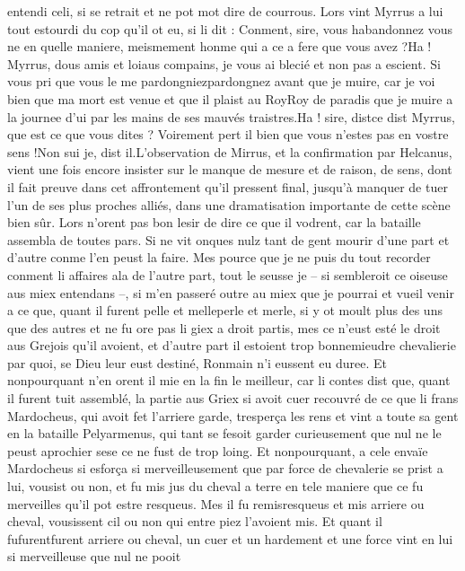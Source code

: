 \documentclass{article}
\begin{document}
\begin{pages}
   entendi celi, si se retrait et ne pot mot dire de courrous. Lors vint Myrrus a lui tout estourdi 
   du cop qu’il ot eu, si li dit :
   Conment, sire, vous habandonnez vous 
      ne en quelle maniere, meismement honme qui a ce a fere que vous avez ?Ha ! Myrrus, dous amis et loiaus compains, je vous ai blecié et non 
      pas a escient. Si vous pri que vous le me pardongniezpardongnez avant 
      que je muire, car je voi bien que ma mort est 
   venue et que il plaist au RoyRoy de paradis que je muire a la journee 
      d’ui par les mains de ses mauvés traistres.Ha ! sire, distce dist 
      Myrrus, que est ce que vous dites ? Voirement pert il bien que vous n’estes pas en vostre sens !Non sui je, dist il.L'observation de Mirrus, et la confirmation 
   par Helcanus, vient une fois encore insister sur le manque de mesure et de raison, de sens, dont il fait preuve dans cet affrontement 
   qu'il pressent final, jusqu'à manquer de tuer l'un de ses plus proches alliés, dans une dramatisation importante de cette scène bien sûr. 
   Lors n’orent pas bon lesir de dire ce que il vodrent, 
   car la bataille assembla de toutes pars. Si ne vit onques nulz tant de gent mourir d’une part et d’autre conme l’en peust la faire. 
   Mes pource que je ne puis du tout recorder conment li affaires ala de l’autre part, tout le seusse je 
   – si sembleroit ce oiseuse aus miex entendans –, si m’en passeré outre au miex que je pourrai et vueil venir a ce que,
   quant il furent pelle et melleperle et merle, si 
   y ot moult plus des uns que des autres 
   et ne fu ore pas li giex a droit partis, mes ce n’eust esté le droit aus Grejois qu’il avoient, 
   et d’autre part il estoient trop 
   bonnemieudre chevalierie par quoi, se Dieu leur eust destiné, 
   Ronmain n’i eussent eu duree. Et nonpourquant 
   n’en orent il mie en la fin le meilleur, car li contes dist que, quant il furent tuit assemblé, la partie aus 
   Griex si avoit cuer recouvré de ce que li frans Mardocheus, 
   qui avoit fet l’arriere garde, tresperça les rens et vint a toute sa gent en la bataille 
   Pelyarmenus, qui tant se fesoit garder curieusement que nul ne le peust aprochier 
   sese ce ne fust de trop loing. Et nonpourquant, a cele envaïe 
   Mardocheus si esforça si merveilleusement que par force de chevalerie se prist a lui, 
   vousist ou non, et fu mis jus du cheval a terre en tele maniere 
   que ce fu merveilles qu’il pot estre resqueus. Mes il fu 
   remisresqueus et mis arriere ou cheval, vousissent 
   cil ou non qui entre piez l’avoient mis. Et quant il 
   fufurentfurent 
   arriere ou cheval, un cuer et un hardement et une force vint en lui si merveilleuse que nul ne pooit 

\end{pages}
\end{document}

